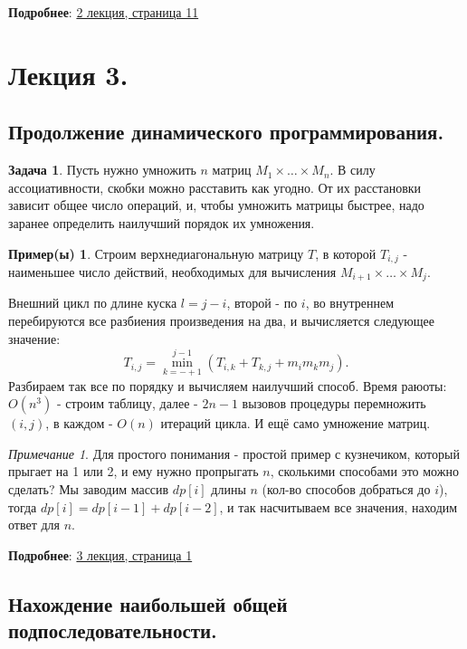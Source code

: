 \documentclass[a4paper]{article}
\theoremstyle{indented}
\theoremstyle{definition}
\newtheorem{exl}{Пример(ы)}
\newtheorem{prob}{Задача}
\theoremstyle{remark}
\newtheorem{remark}{Примечание}
\begin{document}
\textbf{Подробнее}: \href{https://users.math-cs.spbu.ru/~okhotin/teaching/algorithms_2020/okhotin_algorithms_2020_l2.pdf}{2 лекция, страница 11}

\section{Лекция 3.}

\subsection{Продолжение динамического программирования.}

\begin{prob}
    Пусть нужно умножить $n$ матриц $M_1 \times \ldots \times M_n$. В силу ассоциативности, скобки можно расставить как угодно. От их расстановки зависит общее число операций, и, чтобы умножить матрицы быстрее, надо заранее определить наилучший порядок их умножения.
\end{prob}

\begin{exl}
    Строим верхнедиагональную матрицу $T$, в которой $T_{i, j}$ - наименьшее число действий, необходимых для вычисления $M_{i+1} \times \ldots \times M_j$. \ 

    Внешний цикл по длине куска $l=j-i$, второй - по $i$, во внутреннем перебируются все разбиения произведения на два, и вычисляется следующее значение:
    \[
        T_{i, j}=\min_{k=-+1}^{j-1}(T_{i, k}+T_{k, j}+m_im_km_j). 
    \]
    Разбираем так все по порядку и вычисляем наилучший способ. Время раюоты: $O(n^3)$ - строим таблицу, далее - $2n-1$ вызовов процедуры перемножить $(i, j)$, в каждом - $O(n)$ итераций цикла. И ещё само умножение матриц.
\end{exl}

\begin{remark}
    Для простого понимания - простой пример с кузнечиком, который прыгает на 1 или 2, и ему нужно пропрыгать $n$, сколькими способами это можно сделать? Мы заводим массив $dp[i]$ длины $n$ (кол-во способов добраться до $i$), тогда $dp[i]=dp[i-1]+dp[i-2]$, и так насчитываем все значения, находим ответ для $n$. 
\end{remark}

\textbf{Подробнее}: \href{https://users.math-cs.spbu.ru/~okhotin/teaching/algorithms_2020/okhotin_algorithms_2020_l3.pdf}{3 лекция, страница 1}

\subsection{Нахождение наибольшей общей подпоследовательности.}
\end{document}
